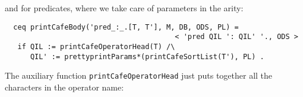 {\begin{comment}
                                        < 'bop QIL ': QIL' '-> Q', ODS >
   if QIL := printCafeOperatorHead(T) /\
      QIL' := prettyprintParams*(printCafeSortList(T'), PL) /\
      Q' := prettyprintParams(downQid(T''), PL) .
  ceq printCafeBody('bop_:_->_`{_`}.[T, T', 'CafeToken[T''], T'''],
                    M, DB, ODS, PL) = < 'bop QIL ': QIL' '-> Q' ' '`{ QIL'' '`}, ODS >
   if QIL := printCafeOperatorHead(T) /\
      QIL' := prettyprintParams*(printCafeSortList(T'), PL) /\
      Q' := prettyprintParams(downQid(T''), PL) /\
      QIL'' := printCafeAttS(T''', M, DB) .
  ceq printCafeBody('ops_:_->_.['neCafeTokenList[T], T', 'CafeToken[T'']],
                    M, DB, ODS, PL) = < 'ops QIL ': QIL' '-> Q', ODS >
   if QIL := printCafeSortList(T) /\
      QIL' := prettyprintParams*(printCafeSortList(T'), PL) /\
      Q' := prettyprintParams(downQid(T''), PL) .
  ceq printCafeBody('ops_:_->_`{_`}.['neCafeTokenList[T], T', 'CafeToken[T''], T'''],
                    M, DB, ODS, PL) = < 'ops QIL ': QIL' '-> Q' ' '`{ QIL'' '`}, ODS >
   if QIL := printCafeSortList(T) /\
      QIL' := prettyprintParams*(printCafeSortList(T'), PL) /\
      Q' := prettyprintParams(downQid(T''), PL) /\
      QIL'' := printCafeAttS(T''', M, DB) .
  ceq printCafeBody('bops_:_->_.['neCafeTokenList[T], T', 'CafeToken[T'']],
                    M, DB, ODS, PL) = < 'bops QIL ': QIL' '-> Q', ODS >
   if QIL := printCafeSortList(T) /\
      QIL' := prettyprintParams*(printCafeSortList(T'), PL) /\
      Q' := prettyprintParams(downQid(T''), PL) .
  ceq printCafeBody('bops_:_->_`{_`}.['neCafeTokenList[T], T', 'CafeToken[T''], T'''],
                    M, DB, ODS, PL) = < 'bops QIL ': QIL' '-> Q' ' '`{ QIL'' '`}, ODS >
   if QIL := printCafeSortList(T) /\
      QIL' := prettyprintParams*(printCafeSortList(T'), PL) /\
      Q' := prettyprintParams(downQid(T''), PL) /\
      QIL'' := printCafeAttS(T''', M, DB) .
\end{comment}
}

\noindent
and for predicates, where we take care of parameters in the arity:

{\codesize
\begin{verbatim}
  ceq printCafeBody('pred_:_.[T, T'], M, DB, ODS, PL) =
                                        < 'pred QIL ': QIL' '., ODS >
   if QIL := printCafeOperatorHead(T) /\
      QIL' := prettyprintParams*(printCafeSortList(T'), PL) .
\end{verbatim}
}

The auxiliary function \verb"printCafeOperatorHead" just puts together all the
characters in the operator name:

